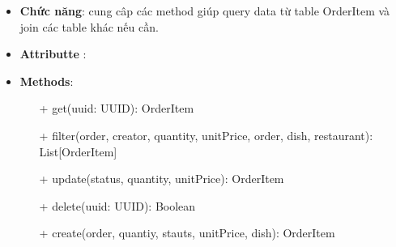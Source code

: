 \begin{itemize}
    \item \textbf{Chức năng}:  cung câp các method giúp query data từ table OrderItem và join các table khác nếu cần.
    \item \textbf{Attributte} :
    \item \textbf{Methods}:
    \begin{itemize}
        \item[+] get(uuid: UUID): OrderItem
        \item[+] filter(order, creator, quantity, unitPrice, order, dish, restaurant): List[OrderItem]
        \item[+] update(status, quantity, unitPrice): OrderItem
        \item[+] delete(uuid: UUID): Boolean
        \item[+] create(order, quantiy, stauts, unitPrice, dish): OrderItem
    \end{itemize}
\end{itemize}